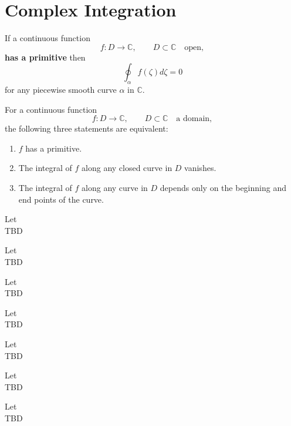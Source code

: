 \section{Complex Integration}


\begin{theorem}
    \label{sec:ClosedContourT}
    If a continuous function
    $$ f : D \rightarrow \mathbb{C}, \qquad D \subset \mathbb{C} \quad \text{open},$$
    \textbf{has a primitive} then
    $$\oint_\alpha f(\zeta)d\zeta = 0$$
    for any piecewise smooth curve $\alpha$ in $\mathbb{C}$.
\end{theorem}


\begin{theorem}
    \label{sec:MainTCalculus}
    For a continuous function
    $$ f : D \rightarrow \mathbb{C}, \qquad D \subset \mathbb{C} \quad \text{a domain},$$
    the following three statements are equivalent:
    \begin{enumerate}[label=\alph*)]
        \item $f$ has a primitive.
        \item The integral of $f$ along any closed curve in $D$ vanishes.
        \item The integral of $f$ along any curve in $D$ depends only on the beginning and end points of the curve.
    \end{enumerate}
\end{theorem}


\begin{theorem}
    \label{sec:CauchyITT}
    Let \\
    TBD
\end{theorem}


\begin{theorem}
    \label{sec:CauchyITR}
    Let \\
    TBD
\end{theorem}


\begin{theorem}
    \label{sec:CauchyIF}
    Let \\
    TBD
\end{theorem}


\begin{theorem}
    \label{sec:GCauchyIF}
    Let \\
    TBD
\end{theorem}


\begin{theorem}
    \label{sec:MoreraT}
    Let \\
    TBD
\end{theorem}


\begin{theorem}
    \label{sec:LiouvilleT}
    Let \\
    TBD
\end{theorem}


\begin{theorem}
    \label{sec:FTAlgebra}
    Let \\
    TBD
\end{theorem}